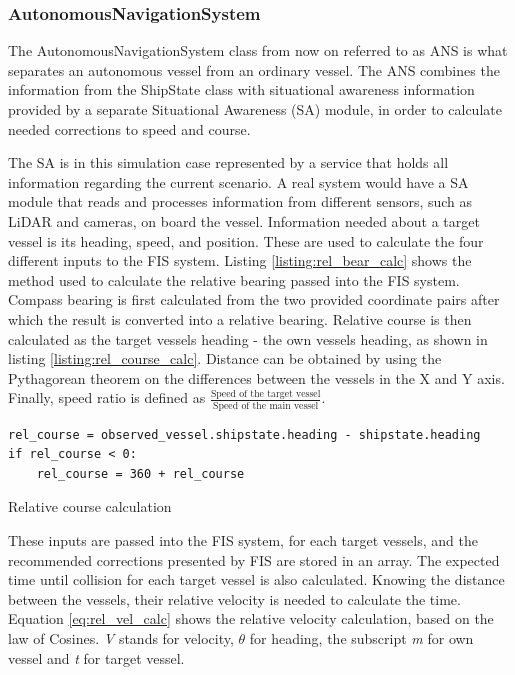 \subsubsection{AutonomousNavigationSystem}
\label{sec:ANS}
The AutonomousNavigationSystem class from now on referred to as ANS is what separates an autonomous vessel from an ordinary vessel. The ANS combines the information from the ShipState class with situational awareness information provided by a separate Situational Awareness (SA) module, in order to calculate needed corrections to speed and course.

The SA is in this simulation case represented by a service that holds all information regarding the current scenario. A real system would have a SA module that reads and processes information from different sensors, such as LiDAR and  cameras, on board the vessel. Information needed about a target vessel is its heading, speed, and position. These are used to calculate the four different inputs to the FIS system. Listing \ref{listing:rel_bear_calc} shows the method used to calculate the relative bearing passed into the FIS system. Compass bearing is first calculated from the two provided coordinate pairs after which the result is converted into a relative bearing. Relative course is then calculated as the target vessels heading - the own vessels heading, as shown in listing \ref{listing:rel_course_calc}. Distance can be obtained by using the Pythagorean theorem on the differences between the vessels in the X and Y axis. Finally, speed ratio is defined as $\frac{\text{Speed of the target vessel}}{\text{Speed of the main vessel}}$.
\begin{listing}

    \begin{verbatim}
rel_course = observed_vessel.shipstate.heading - shipstate.heading
if rel_course < 0:
    rel_course = 360 + rel_course
    \end{verbatim}
    \caption{Relative course calculation}
    \label{listing:rel_course_calc}
\end{listing}

These inputs are passed into the FIS system, for each target vessels, and the recommended corrections presented by FIS are stored in an array. The expected time until collision for each target vessel is also calculated. Knowing the distance between the vessels, their relative velocity is needed to calculate the time. Equation \ref{eq:rel_vel_calc} shows the relative velocity calculation, based on the law of Cosines. \textit{V} stands for velocity, $\theta$ for heading, the subscript \textit{m} for own vessel and \textit{t} for target vessel.

